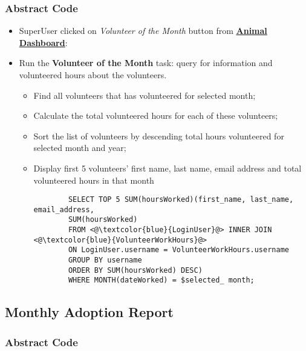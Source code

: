 \documentclass[a4paper]{article}
\begin{document}
\subsubsection*{Abstract Code}

\begin{itemize}
	\item SuperUser clicked on \textit{Volunteer of the Month} button from \underline{\textbf{Animal Dashboard}}:
	\item Run the \textbf{Volunteer of the Month} task: query for information and volunteered hours about the volunteers.
	\begin{itemize}
		\item Find all volunteers that has volunteered for selected month;
		\item Calculate the total volunteered hours for each of these volunteers;
		\item Sort the list of volunteers by descending total hours volunteered for selected month and year;
		\item Display first 5 volunteers' first name, last name, email address and total volunteered hours in that month
		\begin{lstlisting}
		SELECT TOP 5 SUM(hoursWorked)(first_name, last_name, email_address,
		SUM(hoursWorked)
		FROM <@\textcolor{blue}{LoginUser}@> INNER JOIN <@\textcolor{blue}{VolunteerWorkHours}@>
		ON LoginUser.username = VolunteerWorkHours.username
		GROUP BY username
		ORDER BY SUM(hoursWorked) DESC)
		WHERE MONTH(dateWorked) = $selected_ month;
		\end{lstlisting}
	\end{itemize}

\end{itemize}


\hypertarget{monthly_adoption_report}{\subsection{Monthly Adoption Report}}

\subsubsection*{Abstract Code}
\end{document}
